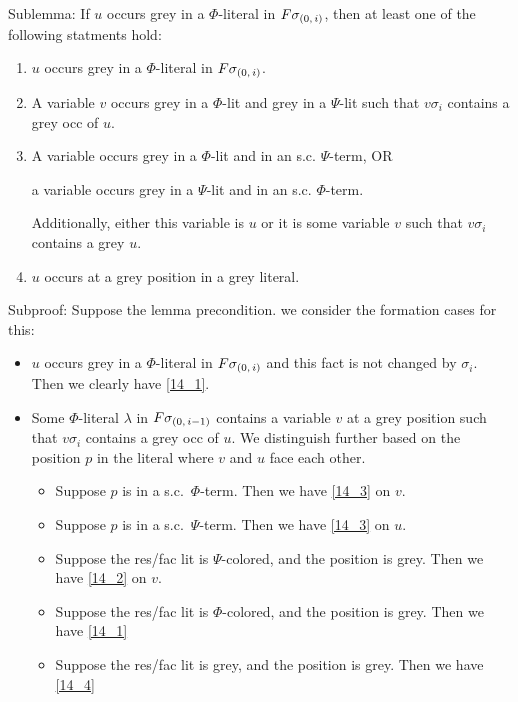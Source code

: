 \documentclass[,%
	draft=false,%
	numbers=noendperiod
	12pt,
	a4paper,
	oneside,%
	openany,
]{memoir}
\begin{document}
\noindent
Sublemma: If $u$ occurs grey in a $\Phi$-literal in $F\sigma_{(0,\,i)}$, then at least one of the following statments hold:
\begin{enumerate}
	\item $u$ occurs grey in a $\Phi$-literal in $F\sigma_{(0,\,i)}$.
		\label{14_1}

	\item 
		\label{14_2}
		A variable $v$ occurs grey in a $\Phi$-lit and grey in a $\Psi$-lit such that $v\sigma_i$ contains a grey occ of $u$.

	\item 
		\label{14_3}
		A variable occurs grey in a $\Phi$-lit and in an s.c. $\Psi$-term, OR

		a variable occurs grey in a $\Psi$-lit and in an s.c. $\Phi$-term.

		Additionally, either this variable is $u$ or it is some variable $v$ such that $v\sigma_i$ contains a grey $u$.

	\item
		\label{14_4}
		$u$ occurs at a grey position in a grey literal.

\end{enumerate}
\noindent
Subproof:
Suppose the lemma precondition. we consider the formation cases for this:
\begin{itemize}
	\item $u$ occurs grey in a $\Phi$-literal in $F\sigma_{(0,\,i)}$ and this fact is not changed by $\sigma_i$.
		Then we clearly have \ref{14_1}.

	\item Some $\Phi$-literal $\lambda$ in $F\sigma_{(0,\,i-1)}$ contains a variable $v$ at a grey position such that $v\sigma_i$ contains a grey occ of $u$. 
		We distinguish further based on the position $p$ in the literal where $v$ and $u$ face each other.

		\begin{itemize}
			\item Suppose $p$ is in a s.c.\ $\Phi$-term. Then we have \ref{14_3} on $v$.
			\item Suppose $p$ is in a s.c.\ $\Psi$-term. Then we have \ref{14_3} on $u$.
			\item Suppose the res/fac lit is $\Psi$-colored, and the position is grey. Then we have \ref{14_2} on $v$.
			\item Suppose the res/fac lit is $\Phi$-colored, and the position is grey. Then we have \ref{14_1}
			\item Suppose the res/fac lit is grey, and the position is grey. Then we have \ref{14_4}

		\end{itemize}


\end{itemize}
\end{document}
